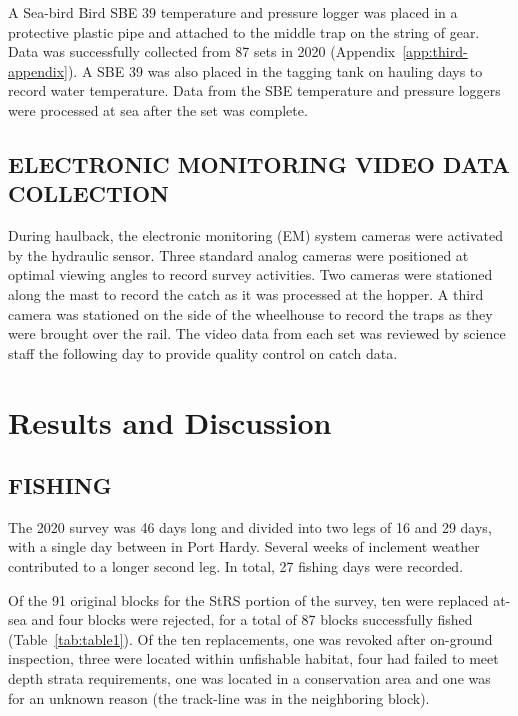 \documentclass[12pt]{article}\usepackage[]{graphicx}\usepackage[]{color}
\begin{document}
A Sea-bird Bird SBE 39 temperature and pressure logger was placed in a protective plastic pipe and attached to the middle trap on the string of gear. Data was successfully collected from 87 sets in 2020 (Appendix~\ref{app:third-appendix}). A SBE 39 was also placed in the tagging tank on hauling days to record water temperature. Data from the SBE temperature and pressure loggers were processed at sea after the set was complete.

\hypertarget{electronic-monitoring-video-data-collection}{%
\subsection{ELECTRONIC MONITORING VIDEO DATA COLLECTION}\label{electronic-monitoring-video-data-collection}}

During haulback, the electronic monitoring (EM) system cameras were activated by the hydraulic sensor. Three standard analog cameras were positioned at optimal viewing angles to record survey activities. Two cameras were stationed along the mast to record the catch as it was processed at the hopper. A third camera was stationed on the side of the wheelhouse to record the traps as they were brought over the rail. The video data from each set was reviewed by science staff the following day to provide quality control on catch data.

\clearpage

\hypertarget{results-and-discussion}{%
\section{Results and Discussion}\label{results-and-discussion}}

\hypertarget{fishing}{%
\subsection{FISHING}\label{fishing}}

The 2020 survey was 46 days long and divided into two legs of 16 and 29 days, with a single day between in Port Hardy. Several weeks of inclement weather contributed to a longer second leg. In total, 27 fishing days were recorded.

Of the 91 original blocks for the StRS portion of the survey, ten were replaced at-sea and four blocks were rejected, for a total of 87 blocks successfully fished (Table~\ref{tab:table1}). Of the ten replacements, one was revoked after on-ground inspection, three were located within unfishable habitat, four had failed to meet depth strata requirements, one was located in a conservation area and one was for an unknown reason (the track-line was in the neighboring block).
\end{document}

